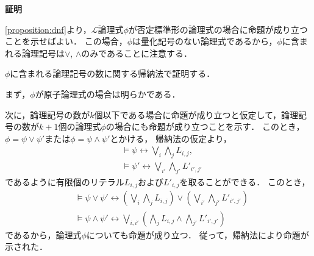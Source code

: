 \documentclass[uplatex, dvipdfmx]{jsarticle}
\makeatletter
\numberwithin{equation}{section}
\renewenvironment{proof}[1][\proofname]{\par
  \pushQED{\qed}%
  \normalfont \topsep6\p@\@plus6\p@\relax
  \trivlist
  \item\relax
  {\bfseries
  #1\@addpunct{.}}\hspace\labelsep\ignorespaces
}{
  \popQED\endtrivlist\@endpefalse
}
\theoremstyle{definition}
\renewcommand{\proofname}{\textbf{証明}}
\makeatother
\begin{document}
\begin{proof}

     \cref{proposition:dnf}より，$\mathcal{L}$論理式$\phi$が否定標準形の論理式の場合に命題が成り立つことを示せばよい．
     この場合，$\phi$は量化記号のない論理式であるから，$\phi$に含まれる論理記号は$\lor$, $\land$のみであることに注意する．
     
     $\phi$に含まれる論理記号の数に関する帰納法で証明する．

     まず，$\phi$が原子論理式の場合は明らかである．

     次に，論理記号の数が$k$個以下である場合に命題が成り立つと仮定して，論理記号の数が$k+1$個の論理式$\phi$の場合にも命題が成り立つことを示す．
     このとき，$\phi = \psi \lor \psi'$または$\phi = \psi \land \psi'$とかける，
     帰納法の仮定より，
     \begin{align}
          &\models \psi \leftrightarrow \bigvee_{i} \bigwedge_j L_{i,j},\\
          &\models \psi' \leftrightarrow \bigvee_{i'} \bigwedge_{j'} L'_{i',j'}
     \end{align}
     であるように有限個のリテラル$L_{i,j}$および$L'_{i,j}$を取ることができる．
     このとき，
     \begin{align}
          &\models \psi \lor  \psi' \leftrightarrow \left( \bigvee_i \bigwedge_j L_{i,j} \right) \vee \left( \bigvee_{i'} \bigwedge_{j'} L'_{i',j'}\right)\\
          &\models \psi \land \psi' \leftrightarrow \bigvee_{i, i'} \left(\bigwedge_j L_{i,j} \wedge \bigwedge_{j'} L'_{i',j'}\right)
     \end{align}
     であるから，論理式$\phi$についても命題が成り立つ．
     従って，帰納法により命題が示された．
\end{proof}
\end{document}
